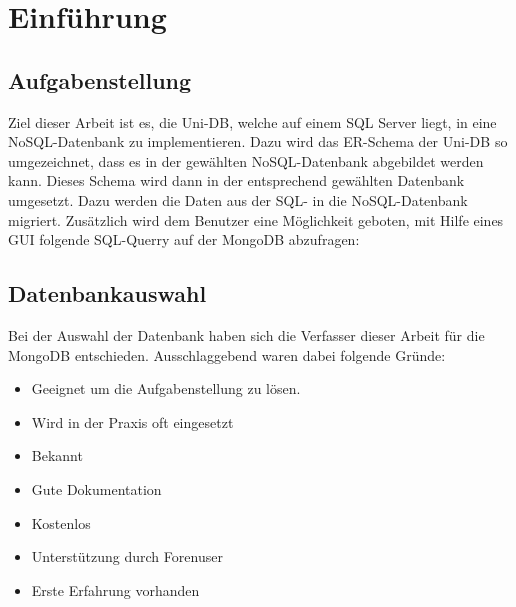 \section{Einführung}

\subsection{Aufgabenstellung}
Ziel dieser Arbeit ist es, die Uni-DB, welche auf einem SQL Server liegt, in eine NoSQL-Datenbank zu implementieren. Dazu wird das ER-Schema der Uni-DB so umgezeichnet, dass es in der gewählten NoSQL-Datenbank abgebildet werden kann. Dieses Schema wird dann in der entsprechend gewählten Datenbank umgesetzt. Dazu werden die Daten aus der SQL- in die NoSQL-Datenbank migriert.
Zusätzlich wird dem Benutzer eine Möglichkeit geboten, mit Hilfe eines GUI folgende SQL-Querry auf der MongoDB abzufragen:




\newpage
\subsection{Datenbankauswahl}
Bei der Auswahl der Datenbank haben sich die Verfasser dieser Arbeit für die MongoDB entschieden. Ausschlaggebend waren dabei folgende Gründe:
\begin{itemize}
  \item Geeignet um die Aufgabenstellung zu lösen.
  \item Wird in der Praxis oft eingesetzt
  \item Bekannt
  \item Gute Dokumentation
  \item Kostenlos
  \item Unterstützung durch Forenuser
  \item Erste Erfahrung vorhanden
\end{itemize}

